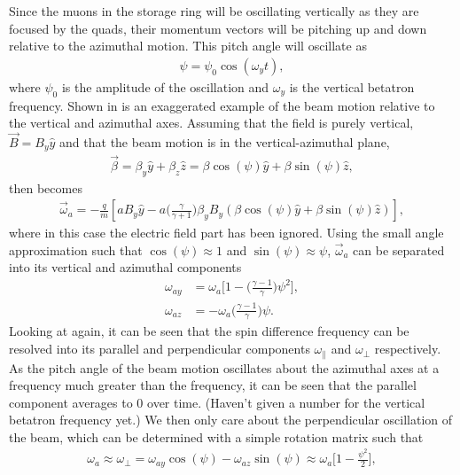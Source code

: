 Since the muons in the storage ring will be oscillating vertically as they are focused by the quads, their momentum vectors will be pitching up and down relative to the azimuthal motion. This pitch angle will oscillate as
        \begin{align} \label{eq:psi}
            \psi = \psi_{0} \cos(\omega_{y}t),
        \end{align}
where $\psi_{0}$ is the amplitude of the oscillation and $\omega_{y}$ is the vertical betatron frequency. Shown in  is an exaggerated example of the beam motion relative to the vertical and azimuthal axes. Assuming that the field is purely vertical, $\vec{B} = B_{y}\hat{y}$ and that the beam motion is in the vertical-azimuthal plane,
        \begin{align}
            \vec{\beta} = \beta_{y}\hat{y} + \beta_{z}\hat{z} = \beta\cos(\psi)\hat{y} + \beta\sin(\psi)\hat{z},
        \end{align}
then \wa becomes
        \begin{align}
            \vec{\omega}_{a} = -\frac{q}{m} [a B_{y} \hat{y} - a \Big(\frac{\gamma}{\gamma+1}\Big) \beta_{y}B_{y} (\beta\cos(\psi)\hat{y} + \beta\sin(\psi)\hat{z})],        
        \end{align}
where in this case the electric field part has been ignored. Using the small angle approximation such that $\cos(\psi) \approx 1$ and $\sin(\psi) \approx \psi$, $\vec{\omega}_{a}$ can be separated into its vertical and azimuthal components
        \begin{align}
            \omega_{ay} &= \omega_{a}\Big[ 1 - \Big(\frac{\gamma-1}{\gamma}\Big) \psi^{2} \Big], \\     
            \omega_{az} &= -\omega_{a} \Big(\frac{\gamma-1}{\gamma}\Big) \psi.
        \end{align}
Looking at  again, it can be seen that the spin difference frequency can be resolved into its parallel and perpendicular components $\omega_{\parallel}$ and $\omega_{\perp}$ respectively. As the pitch angle of the beam motion oscillates about the azimuthal axes at a frequency much greater than the \gmtwo frequency, it can be seen that the parallel component averages to 0 over time. (Haven't given a number for the vertical betatron frequency yet.) We then only care about the perpendicular oscillation of the beam, which can be determined with a simple rotation matrix such that
        \begin{align}
            \omega_{a} \approx \omega_{\perp} = \omega_{ay} \cos(\psi) - \omega_{az}\sin(\psi) \approx \omega_{a} \Big[ 1 - \frac{\psi^{2}}{2} \Big],
        \end{align}
